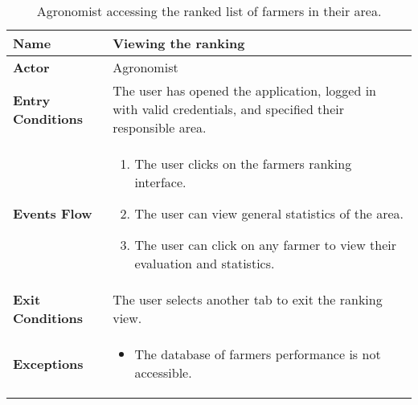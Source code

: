 
\begin{table}[hbt!]
\centering
\small
\caption{\label{tab:agrViewRank}Agronomist accessing the ranked list of farmers in their area.}

\begin{tabular}{|l|>{\raggedright\arraybackslash}m{12cm}|}

    \hline
    \textbf{Name} & Viewing the ranking\\
    \hline
   	\textbf{Actor} & Agronomist\\
    \hline
    
    \textbf{Entry Conditions} & The user has opened the application, logged in with valid credentials, and specified their responsible area. \\
    \hline
    \textbf{Events Flow} & \begin{enumerate}
            \item The user clicks on the farmers ranking interface.
            \item The user can view general statistics of the area.
            \item The user can click on any farmer to view their evaluation and statistics.
       \end{enumerate}\\
    \hline
    \textbf{Exit Conditions} & The user selects another tab to exit the ranking view.\\
    \hline
    \textbf{Exceptions} & 
       \begin{itemize}
          \item The database of farmers performance is not accessible.%
        \end{itemize}
     \\
    \hline
\end{tabular}
\end{table}